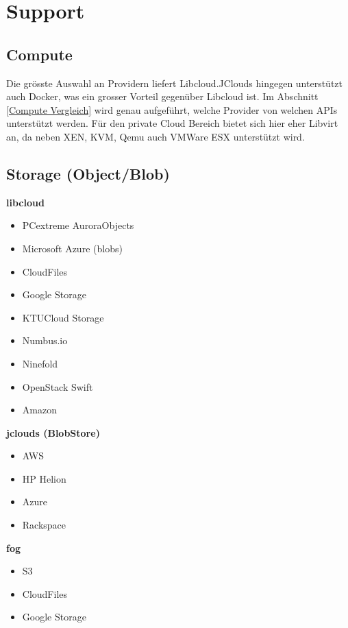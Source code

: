 \section{Support}
\subsection{Compute}
Die grösste Auswahl an Providern liefert Libcloud.JClouds hingegen 
unterstützt auch Docker, was ein grosser Vorteil gegenüber Libcloud ist. Im 
Abschnitt \ref{Compute Vergleich} wird genau aufgeführt, 
welche Provider von welchen APIs unterstützt werden.
Für den private Cloud Bereich bietet sich hier eher Libvirt an, da neben XEN, 
KVM, Qemu auch VMWare ESX unterstützt wird.

\subsection{Storage (Object/Blob)}
\textbf{libcloud}
\begin{multicols}{2}
\begin{itemize}
\item PCextreme AuroraObjects
\item Microsoft Azure (blobs)
\item CloudFiles
\item Google Storage
\item KTUCloud Storage
\item Numbus.io
\item Ninefold
\item OpenStack Swift
\item Amazon
\end{itemize}
\end{multicols}

\textbf{jclouds (BlobStore)}
\begin{multicols}{2}
\begin{itemize}
\item AWS
\item HP Helion
\item Azure
\item Rackspace
\end{itemize}
\end{multicols}

\textbf{fog}
\begin{multicols}{2}
\begin{itemize}
\item S3
\item CloudFiles
\item Google Storage
\end{itemize}
\end{multicols}

